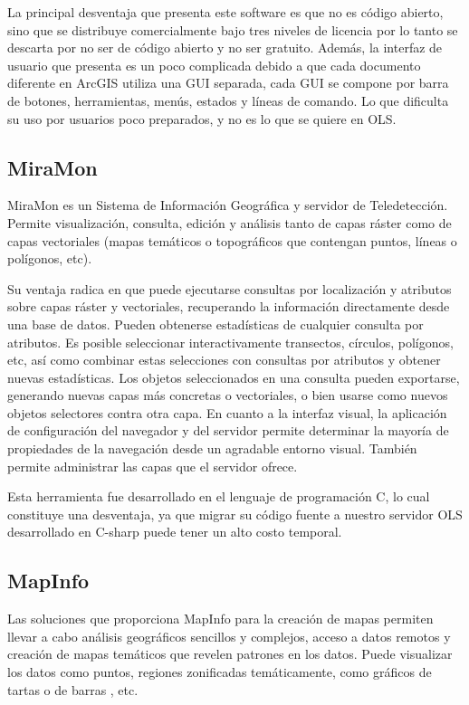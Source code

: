 La principal desventaja que presenta este software es que no es c\'odigo abierto, sino que se distribuye comercialmente bajo tres niveles de licencia por lo tanto se descarta por no ser de c\'odigo abierto y no ser gratuito. Adem\'as, la interfaz de usuario que presenta es un poco complicada debido a que cada documento diferente en ArcGIS utiliza una GUI separada, cada GUI se compone por barra de botones, herramientas, men\'us, estados y l\'ineas de comando. Lo que dificulta su uso por usuarios poco preparados, y no es lo que se quiere en OLS.


\subsection{MiraMon}
MiraMon es un Sistema de Informaci\'on Geogr\'afica y servidor de Teledetecci\'on. Permite visualizaci\'on, consulta, edici\'on y an\'alisis tanto de capas r\'aster como de capas vectoriales (mapas tem\'aticos o topogr\'aficos que contengan puntos, l\'ineas o pol\'igonos, etc).

Su ventaja radica en que puede ejecutarse consultas por localizaci\'on y atributos sobre capas r\'aster y vectoriales, recuperando la informaci\'on directamente desde una base de datos. Pueden obtenerse estad\'isticas de cualquier consulta por atributos. Es posible seleccionar interactivamente transectos, c\'irculos, pol\'igonos, etc, as\'i como combinar estas selecciones con consultas por atributos y obtener nuevas estad\'isticas. Los objetos seleccionados en una consulta pueden exportarse, generando nuevas capas m\'as concretas o vectoriales, o bien usarse como nuevos objetos selectores contra otra capa. En cuanto a la interfaz visual, la aplicaci\'on de configuraci\'on del navegador y del servidor permite determinar la mayor\'ia de propiedades de la navegaci\'on desde un agradable entorno visual. Tambi\'en permite administrar las capas que el servidor ofrece.

Esta herramienta fue desarrollado en el lenguaje de programaci\'on C, lo cual constituye una desventaja, ya que migrar su c\'odigo fuente a nuestro servidor OLS desarrollado en C-sharp puede tener un alto costo temporal.


\subsection{MapInfo}
Las soluciones que proporciona MapInfo para la creaci\'on de mapas permiten llevar a cabo an\'alisis geogr\'aficos sencillos y complejos, acceso a datos remotos y creaci\'on de mapas tem\'aticos que revelen patrones en los datos. Puede visualizar los
datos como puntos, regiones zonificadas tem\'aticamente, como gr\'aficos de tartas o de barras , etc.

